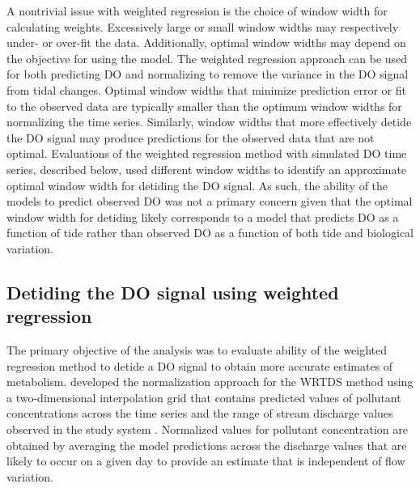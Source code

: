 \documentclass[letterpaper,12pt,oneside]{article}\usepackage[]{graphicx}\usepackage[]{color}
\begin{document}
A nontrivial issue with weighted regression is the choice of window width for calculating weights.  Excessively large or small window widths may respectively under- or over-fit the data.  Additionally, optimal window widths may depend on the objective for using the model.  The weighted regression approach can be used for both predicting \ac{DO} and normalizing to remove the variance in the \ac{DO} signal from tidal changes.  Optimal window widths that minimize prediction error or fit to the observed data are typically smaller than the optimum window widths for normalizing the time series.  Similarly, window widths that more effectively detide the \ac{DO} signal may produce predictions for the observed data that are not optimal.  Evaluations of the weighted regression method with simulated \ac{DO} time series, described below, used different window widths to identify an approximate optimal window width for detiding the \ac{DO} signal.  As such, the ability of the models to predict observed \ac{DO} was not a primary concern given that the optimal window width for detiding likely corresponds to a model that predicts \ac{DO} as a function of tide rather than observed \ac{DO} as a function of both tide and biological variation.  

\subsection{Detiding the \ac{DO} signal using weighted regression}

The primary objective of the analysis was to evaluate ability of the weighted regression method to detide a \ac{DO} signal to obtain more accurate estimates of metabolism.  \citet{Hirsch10} developed the normalization approach for the \ac{WRTDS} method using a two-dimensional interpolation grid that contains predicted values of pollutant concentrations across the time series and the range of stream discharge values observed in the study system \citep{Hirsch10}.  Normalized values for pollutant concentration are obtained by averaging the model predictions across the discharge values that are likely to occur on a given day to provide an estimate that is independent of flow variation.    
\end{document}
